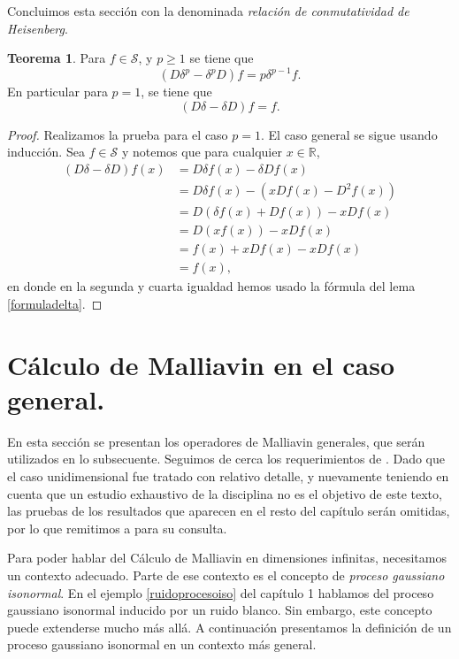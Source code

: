 \documentclass[letterpaper,twoside,12pt]{book}
\newcommand{\R}{\mathbb{R}}
\renewcommand{\S}{\mathcal{S}}
\newcommand{\1}{\mathds{1}}
\theoremstyle{definition}
\theoremstyle{definition}
\newtheorem{teo}{Teorema}
\theoremstyle{remark}
\theoremstyle{definition}
\theoremstyle{definition}
\theoremstyle{definition}
\theoremstyle{definition}
\theoremstyle{definition}
\begin{document}
Concluimos esta sección con la denominada \textit{relación de conmutatividad de Heisenberg}.
\begin{teo} 
 Para $f\in \S$, y $p\geq1$ se tiene que 
 \[
    (D\delta^p-\delta^p D)f=p\delta^{p-1}f.
 \]
 En particular para $p=1$, se tiene que
 \[
 (D\delta-\delta D)f=f.
 \]
 \end{teo}
\begin{proof} 
   Realizamos la prueba para el caso $p=1$. El caso general se sigue usando inducción. Sea $f\in \S$ y notemos que para cualquier $x\in \R$, 
\begin{align*}
   (D\delta-\delta D)f(x)&=D\delta f(x) - \delta D f(x)\\
   &=D \delta f(x) - (xDf(x)-D^2f(x))\\
   &=D \left(\delta f(x)+Df(x)\right) -xDf(x)\\
   &=D \left(xf(x)\right)-xDf(x)\\
   &=f(x)+xDf(x)-xDf(x)\\
   &=f(x),
\end{align*}
en donde en la segunda y cuarta igualdad hemos usado la fórmula del lema \ref{formuladelta}.
 \end{proof}
\section{Cálculo de Malliavin en el caso general.}

En esta sección se presentan los operadores de Malliavin generales, que serán utilizados en lo subsecuente. Seguimos de cerca los requerimientos de \cite[sección 2.1]{KUZGUN202268}. Dado que el caso unidimensional fue tratado con relativo detalle, y nuevamente teniendo en cuenta que un estudio exhaustivo de la disciplina no es el objetivo de este texto, las pruebas de los resultados que aparecen en el resto del capítulo serán omitidas, por lo que remitimos a \cite[capítulo 2]{Nourdin_Peccati_2012} para su consulta.

Para poder hablar del Cálculo de Malliavin en dimensiones infinitas, necesitamos un contexto adecuado. Parte de ese contexto es el concepto de \textit{proceso gaussiano isonormal}. En el ejemplo \ref{ruidoprocesoiso} del capítulo 1 hablamos del proceso gaussiano isonormal inducido por un ruido blanco. Sin embargo, este concepto puede extenderse mucho más allá. A continuación presentamos la definición de un proceso gaussiano isonormal en un contexto más general.
\end{document}

